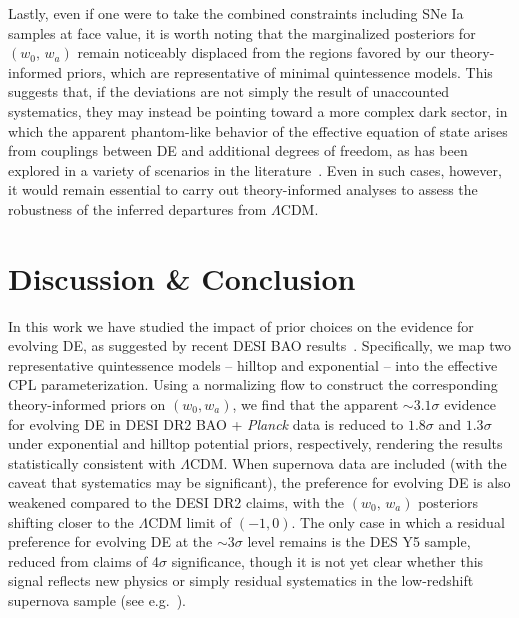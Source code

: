 \documentclass[floats,floatfix,showpacs,amssymb,prd,twocolumn,superscriptaddress,nofootinbib,reprint,preprintnumbers]{revtex4-2}
\begin{document}
Lastly, even if one were to take the combined constraints including SNe Ia samples at face value, it is worth noting that the marginalized posteriors for $(w_0,\,w_a)$ remain noticeably displaced from the regions favored by our theory-informed priors, which are representative of minimal quintessence models. This suggests that, if the deviations are not simply the result of unaccounted systematics, they may instead be pointing toward a more complex dark sector, in which the apparent phantom-like behavior of the effective equation of state arises from couplings between DE and additional degrees of freedom, as has been explored in a variety of scenarios in the literature~\cite{Ye:2024ywg,Chakraborty:2024xas,Wang:2024hks,Giare:2024smz,Li:2024qso,Aboubrahim:2024cyk,Pan:2025psn,Cai:2025mas, Wolf:2024stt,Ye:2024zpk,Tiwari:2024gzo,Chakraborty:2025syu,Khoury:2025txd,Wolf:2025jed,Bedroya:2025fwh,Brax:2025ahm, Li:2025owk,Sabogal:2025mkp,Tsedrik:2025cwc,Zhai:2025hfi,Shah:2025ayl,Silva:2025hxw,Pan:2025qwy,Yashiki:2025loj,Barman:2025ryg,Li:2025ula, Wang:2025znm,Petri:2025swg, vanderWesthuizen:2025rip}. Even in such cases, however, it would remain essential to carry out theory-informed analyses to assess the robustness of the inferred departures from $\Lambda$CDM.



\section{Discussion \& Conclusion}\label{DNC}


\noindent In this work we have studied the impact of prior choices on the evidence for evolving DE, as suggested by recent DESI BAO results~\cite{DESI:2024mwx,DESI:2025zgx}. Specifically, we map two representative quintessence models -- hilltop and exponential -- into the effective CPL parameterization. Using a normalizing flow  to construct the corresponding theory-informed priors on $(w_0,w_a)$, we find that the apparent $\sim 3.1\sigma$ evidence for evolving DE in DESI DR2 BAO + \textit{Planck} data is reduced to $1.8\sigma$ and $1.3\sigma$ under exponential and hilltop potential priors, respectively, rendering the results statistically consistent with $\Lambda$CDM. When supernova data are included (with the caveat that systematics may be significant), the preference for evolving DE is also weakened compared to the DESI DR2 claims, with the $(w_0,\,w_a)$ posteriors shifting closer to the $\Lambda$CDM limit of $(-1,0)$. The only case in which  a residual preference for evolving DE at the $\sim 3\sigma$ level remains is the DES Y5 sample, reduced from claims of 4$\sigma$ significance, though it is not yet clear whether this signal reflects new physics  or simply residual systematics in the low-redshift supernova sample (see e.g.~\cite{Efstathiou:2024xcq,Notari:2024zmi,DES:2025tir, Cortes:2025joz}). 
\end{document}
